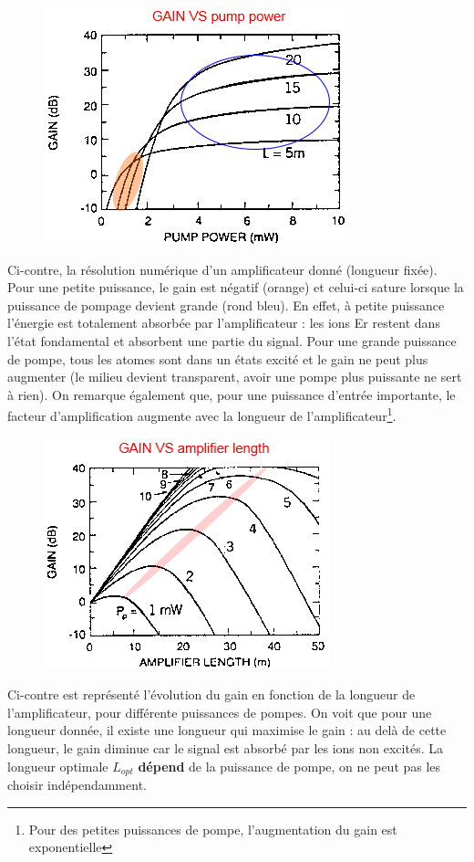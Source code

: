 	\begin{figure}
	\vspace{-3mm}
	\includegraphics[scale=0.65]{ch6/image7}
	\end{figure}
Ci-contre, la résolution numérique d'un amplificateur donné (longueur fixée). Pour une petite 
puissance, le gain est négatif (orange) et celui-ci sature lorsque la puissance de pompage devient grande (rond bleu). En effet, à petite puissance l'énergie est totalement absorbée par l'amplificateur
: les ions Er restent dans l'état fondamental et absorbent une partie du signal. Pour une grande
puissance de pompe, tous les atomes sont dans un états excité et le gain ne peut plus augmenter (le
milieu devient transparent, avoir une pompe plus puissante ne sert à rien). On remarque également que,
pour une puissance d'entrée importante, le facteur d'amplification augmente avec la longueur de
l'amplificateur\footnote{Pour des petites puissances de pompe, l'augmentation du gain est
exponentielle}.  \\

	\begin{figure}
	\vspace{-5mm}
	\includegraphics[scale=0.5]{ch6/image8}
	\end{figure}
Ci-contre est représenté l'évolution du gain en fonction de la longueur de l'amplificateur, pour
différente puissances de pompes. On voit que pour une longueur donnée, il existe une longueur qui
maximise le gain : au delà de cette longueur, le gain diminue car le signal est absorbé par les
ions non excités. La longueur optimale $L_{opt}$ \textbf{dépend} de la puissance de pompe, on ne peut
pas les choisir indépendamment. \\

